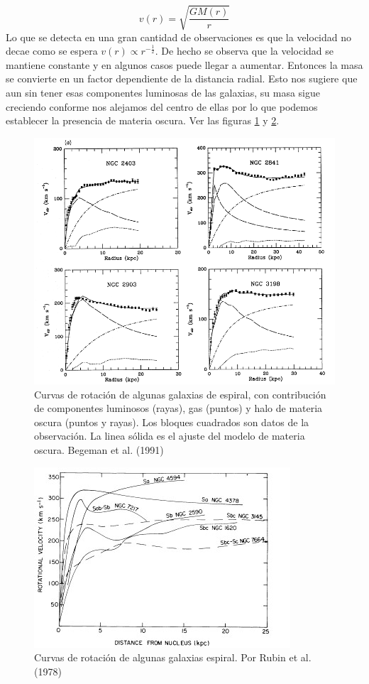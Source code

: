 \documentclass[12pt]{article}
\begin{document}
\begin{equation}
    v(r) = \sqrt{\frac{GM(r)}{r}}
\end{equation}
 Lo que se detecta en una gran cantidad de observaciones es que la velocidad no decae como se espera $v(r) \propto r^{-\frac{1}{2}}$. De hecho se observa que la velocidad se mantiene constante y en algunos casos puede llegar a aumentar. Entonces la masa se convierte en un factor dependiente de la distancia radial. Esto nos sugiere que aun sin tener esas componentes luminosas de las galaxias, su masa sigue creciendo conforme nos alejamos del centro de ellas por lo que podemos establecer la presencia de materia oscura. Ver las figuras \ref{rotationbegeman} y \ref{rotationvera}. 
\begin{figure}
    \centering
    \includegraphics[scale=0.35]{Figures/galaxyrotationcurves.png}
    \caption{Curvas de rotación de algunas galaxias de espiral, con contribución de componentes luminosos (rayas), gas (puntos) y halo de materia oscura (puntos y rayas). Los bloques cuadrados son datos de la observación. La linea sólida es el ajuste del modelo de materia oscura. Begeman et al. (1991)}
    \label{rotationbegeman}
\end{figure}
\begin{figure}[htb]
    \centering
    \includegraphics[scale=.6]{Figures/galaxyrotationvera.jpg}
    \caption{Curvas de rotación de algunas galaxias espiral. Por Rubin et al. (1978)}
    \label{rotationvera}
\end{figure}
\\
\end{document}
